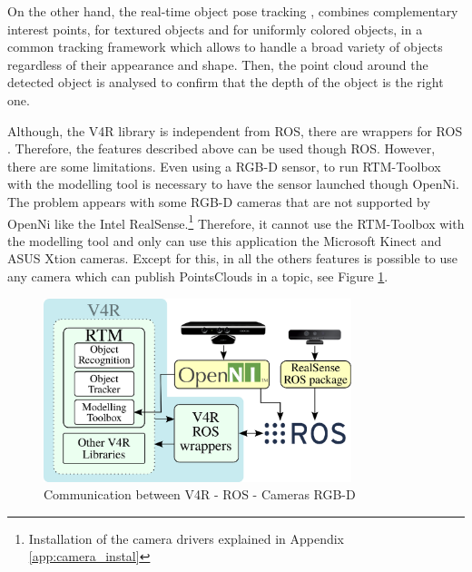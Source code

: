 \documentclass[12pt,a4paper,final,twoside,openright]{report}
\begin{document}
On the other hand, the real-time object pose tracking \cite{Prankl2013} \cite{Aldoma2013}, combines complementary interest points, for textured objects and for uniformly colored objects, in a common tracking framework which allows to handle a broad variety of objects regardless of their appearance and shape. Then, the point cloud around the detected object is analysed to confirm that the depth of the object is the right one.

Although, the V4R library is independent from ROS, there are wrappers for ROS \cite{gitV4RWrappers}. Therefore, the features described above can be used though ROS. However, there are some limitations. Even using a RGB-D sensor, to run RTM-Toolbox with the modelling tool is necessary to have the sensor launched though OpenNi. The problem appears with some RGB-D cameras that are not supported by OpenNi like the Intel RealSense.\footnote{Installation of the camera drivers explained in Appendix \ref{app:camera_instal}} Therefore, it cannot use the RTM-Toolbox with the modelling tool and only can use this application the Microsoft Kinect and ASUS Xtion cameras. Except for this, in all the others features is possible to use any camera which can publish PointsClouds in a topic, see Figure \ref{fig:V4R-ROS}.

\begin{figure}[h]
\centering
\includegraphics[width=0.8\textwidth]{images/V4R-ROS.eps}
\caption{Communication between V4R - ROS - Cameras RGB-D\label{fig:V4R-ROS}}
\end{figure}
\end{document}

